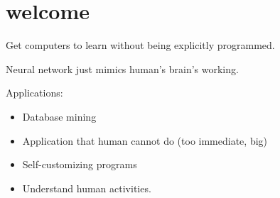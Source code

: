 \documentclass[cn,11pt,chinese,black,simple]{../elegantbook}
\begin{document}
\fi 
\def\chapname{00welcome}

\chapter{welcome}

\begin{definition}
    Get computers to learn without being explicitly programmed.
\end{definition}

Neural network just mimics human's brain's working. 


Applications: 

\begin{itemize}
    \item Database mining
    \item Application that human cannot do (too immediate, big)
    \item Self-customizing programs 
    \item Understand human activities.
\end{itemize}



\let\chapname\undefined
\ifx\mainclass\undefined
\end{document}
